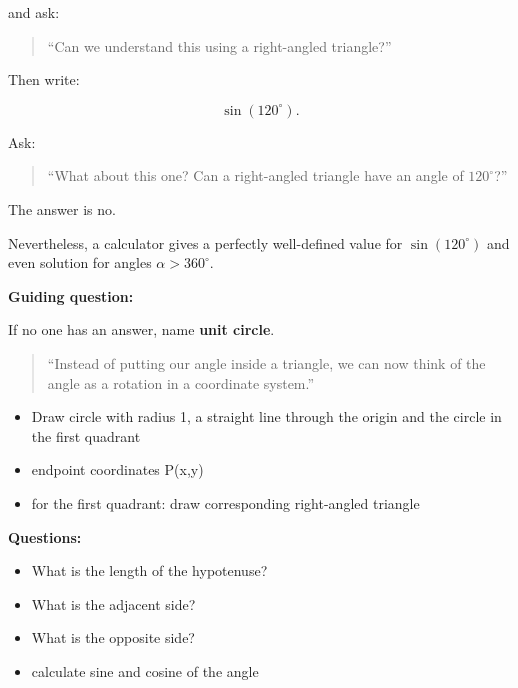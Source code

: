 \documentclass[a4paper,11pt]{article}
\begin{document}
and ask:

\begin{quote}
    ``Can we understand this using a right-angled triangle?''
\end{quote}

Then write:

\begin{equation}
    \sin(120^\circ).
\end{equation}

Ask:

\begin{quote}
    ``What about this one? Can a right-angled triangle have an angle of
    $120^\circ$?''
\end{quote}

The answer is no.

Nevertheless, a calculator gives a perfectly well-defined value for
$\sin(120^\circ)$ and even solution for angles $\alpha > 360 ^\circ$.

\textbf{Guiding question:}

\begin{center}
\end{center}

If no one has an answer, name \textbf{unit circle}.


\begin{quote}
    ``Instead of putting our angle inside a triangle, we can now think of the angle as a rotation in a coordinate system.''
\end{quote}

\begin{itemize}
\item Draw circle with radius 1, a straight line through the origin and the circle in the first quadrant 
\item endpoint coordinates P(x,y) 
\item for the first quadrant: draw corresponding right-angled triangle 
\end{itemize}

\textbf{Questions:}

\begin{itemize}
    \item What is the length of the hypotenuse?
    \item What is the adjacent side?
    \item What is the opposite side?
    \item calculate sine and cosine of the angle 
\end{itemize}
\end{document}
